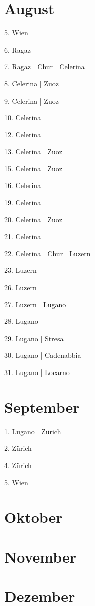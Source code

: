 \documentclass[twoside=false,titlepage=false,open=any, parskip=never, fontsize=10pt, headings=small, chapterprefix=false, appendixprefix=false, DIV=15]{scrbook}
\begin{document}
\begin{multicols}{3}
            \section*{August}
            5. Wien\par
            6. Ragaz\par
            7. Ragaz | Chur | Celerina\par
            8. Celerina | Zuoz\par
            9. Celerina | Zuoz\par
            10. Celerina\par
            12. Celerina\par
            13. Celerina | Zuoz\par
            15. Celerina | Zuoz\par
            16. Celerina\par
            19. Celerina\par
            20. Celerina | Zuoz\par
            21. Celerina\par
            22. Celerina | Chur | Luzern\par
            23. Luzern\par
            26. Luzern\par
            27. Luzern | Lugano\par
            28. Lugano\par
            29. Lugano | Stresa\par
            30. Lugano | Cadenabbia\par
            31. Lugano | Locarno\par
            \section*{September}
            1. Lugano | Zürich\par
            2. Zürich\par
            4. Zürich\par
            5. Wien\par
            \section*{Oktober}
            \section*{November}
            \section*{Dezember}

\end{multicols}
\end{document}
